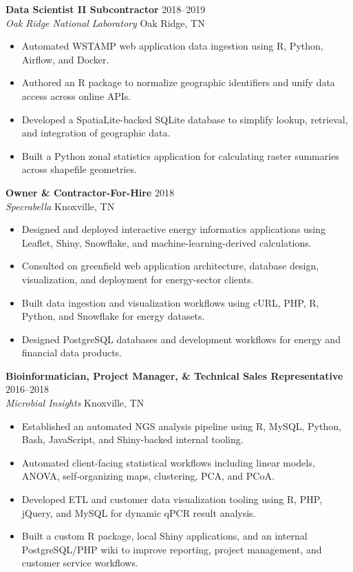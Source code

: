 \documentclass[10pt]{article}
\newcommand{\role}[4]{%
    \textbf{#1} \hfill #4\\
    \textit{#2} \hfill #3
}
\begin{document}
\role{Data Scientist II Subcontractor}{Oak Ridge National Laboratory}{Oak Ridge, TN}{2018--2019}
\begin{itemize}
    \item Automated WSTAMP web application data ingestion using R, Python, Airflow, and Docker.
    \item Authored an R package to normalize geographic identifiers and unify data access across online APIs.
    \item Developed a SpatiaLite-backed SQLite database to simplify lookup, retrieval, and integration of geographic data.
    \item Built a Python zonal statistics application for calculating raster summaries across shapefile geometries.
\end{itemize}

\role{Owner \& Contractor-For-Hire}{Specrabella}{Knoxville, TN}{2018}
\begin{itemize}
    \item Designed and deployed interactive energy informatics applications using Leaflet, Shiny, Snowflake, and machine-learning-derived calculations.
    \item Consulted on greenfield web application architecture, database design, visualization, and deployment for energy-sector clients.
    \item Built data ingestion and visualization workflows using cURL, PHP, R, Python, and Snowflake for energy datasets.
    \item Designed PostgreSQL databases and development workflows for energy and financial data products.
\end{itemize}

\role{Bioinformatician, Project Manager, \& Technical Sales Representative}{Microbial Insights}{Knoxville, TN}{2016--2018}
\begin{itemize}
    \item Established an automated NGS analysis pipeline using R, MySQL, Python, Bash, JavaScript, and Shiny-backed internal tooling.
    \item Automated client-facing statistical workflows including linear models, ANOVA, self-organizing maps, clustering, PCA, and PCoA.
    \item Developed ETL and customer data visualization tooling using R, PHP, jQuery, and MySQL for dynamic qPCR result analysis.
    \item Built a custom R package, local Shiny applications, and an internal PostgreSQL/PHP wiki to improve reporting, project management, and customer service workflows.
\end{itemize}
\end{document}
